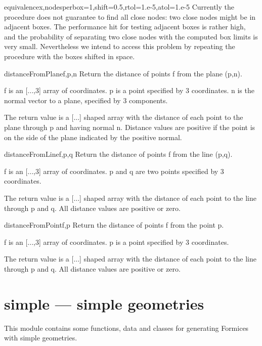 {{\begin{funcdesc}{equivalence}{x,nodesperbox=1,shift=0.5,rtol=1.e-5,atol=1.e-5}
    Currently the procedure does not guarantee to find all close nodes:
    two close nodes might be in adjacent boxes. The performance hit for
    testing adjacent boxes is rather high, and the probability of separating
    two close nodes with the computed box limits is very small. Nevertheless
    we intend to access this problem by repeating the procedure with the
    boxes shifted in space.
\end{funcdesc}
    


\begin{funcdesc}{distanceFromPlane}{f,p,n}
    Return the distance of points f from the plane (p,n).

    f is an [...,3] array of coordinates.
    p is a point specified by 3 coordinates.
    n is the normal vector to a plane, specified by 3 components.

    The return value is a [...] shaped array with the distance of
    each point to the plane through p and having normal n.
    Distance values are positive if the point is on the side of the
    plane indicated by the positive normal.
\end{funcdesc}
    


\begin{funcdesc}{distanceFromLine}{f,p,q}
    Return the distance of points f from the line (p,q).

    f is an [...,3] array of coordinates.
    p and q are two points specified by 3 coordinates.

    The return value is a [...] shaped array with the distance of
    each point to the line through p and q.
    All distance values are positive or zero.
\end{funcdesc}
    


\begin{funcdesc}{distanceFromPoint}{f,p}
    Return the distance of points f from the point p.

    f is an [...,3] array of coordinates.
    p is a point specified by 3 coordinates.

    The return value is a [...] shaped array with the distance of
    each point to the line through p and q.
    All distance values are positive or zero.
\end{funcdesc}
    


\section{simple --- simple geometries}
{\label{sec:simple}
This module contains some functions, data and classes for generating Formices with simple geometries. 


}}}
